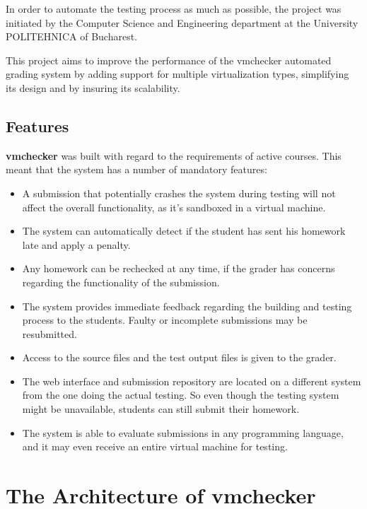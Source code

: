 In order to automate the testing process as much as possible, the \project project 
was initiated by the Computer Science and Engineering department at the 
University POLITEHNICA of Bucharest.

This project aims to improve the performance of the vmchecker automated grading
system by adding support for multiple virtualization types, simplifying its
design and by insuring its scalability.


\subsection{Features}
\label{sub-sec:vmc-history-features}

{\bf vmchecker} was built with regard to the requirements of active courses. This
meant that the system has a number of mandatory features:

\begin{itemize}
\item A submission that potentially crashes the system during testing will not affect
the overall functionality, as it's sandboxed in a virtual machine.
\item The system can automatically detect if the student has sent his homework late
and apply a penalty.
\item Any homework can be rechecked at any time, if the grader has concerns regarding
the functionality of the submission.
\item The system provides immediate feedback regarding the building and testing 
process to the students. Faulty or incomplete submissions may be resubmitted.
\item Access to the source files and the test output files is given to the grader.
\item The web interface and submission repository are located on a different system
from the one doing the actual testing. So even though the testing system might
be unavailable, students can still submit their homework.
\item The system is able to evaluate submissions in any programming language,
and it may even receive an entire virtual machine for testing.
\end{itemize}


\section{The Architecture of vmchecker}
\label{sec:vmc-architecture}

